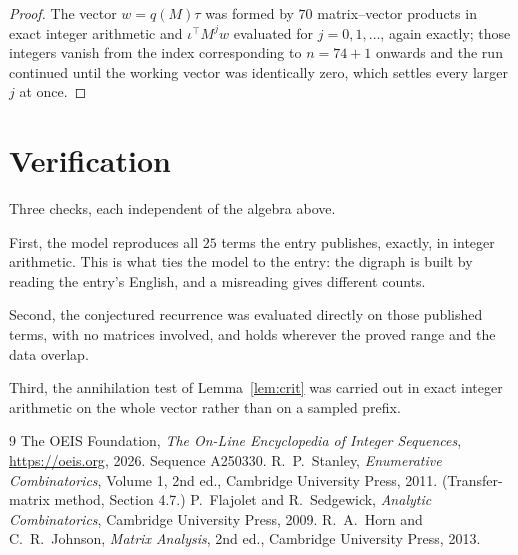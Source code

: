 \documentclass[11pt,a4paper]{article}
\theoremstyle{plain}
\theoremstyle{definition}
\begin{document}
\begin{proof}
The vector $w=q(M)\tau$ was formed by $70$ matrix--vector products in exact integer
arithmetic and $\iota^{\!\top}M^{j}w$ evaluated for $j=0,1,\dots$, again exactly; those
integers vanish from the index corresponding to $n=74+1$ onwards and the run continued
until the working vector was identically zero, which settles every larger $j$ at once.
\end{proof}

\section{Verification}

Three checks, each independent of the algebra above.

First, the model reproduces all $25$ terms the entry publishes, exactly, in integer
arithmetic. This is what ties the model to the entry: the digraph is built by reading the
entry's English, and a misreading gives different counts.

Second, the conjectured recurrence was evaluated directly on those published terms, with no
matrices involved, and holds wherever the proved range and the data overlap.

Third, the annihilation test of Lemma~\ref{lem:crit} was carried out in exact integer
arithmetic on the whole vector rather than on a sampled prefix.

\begin{thebibliography}{9}
 The OEIS Foundation, \emph{The On-Line Encyclopedia of Integer
Sequences}, \url{https://oeis.org}, 2026. Sequence A250330.
 R.~P.~Stanley, \emph{Enumerative Combinatorics}, Volume 1, 2nd ed.,
Cambridge University Press, 2011. (Transfer-matrix method, Section 4.7.)
 P.~Flajolet and R.~Sedgewick, \emph{Analytic Combinatorics}, Cambridge
University Press, 2009.
 R.~A.~Horn and C.~R.~Johnson, \emph{Matrix Analysis}, 2nd ed., Cambridge
University Press, 2013.
\end{thebibliography}
\end{document}
